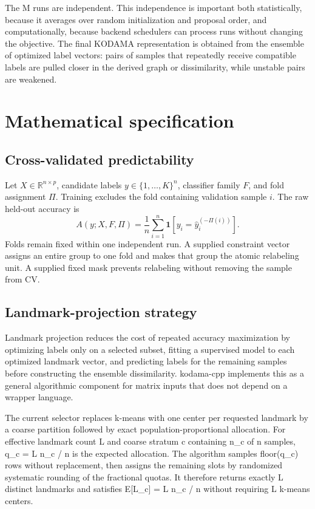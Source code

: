 \documentclass[twoside,11pt]{article}
\begin{document}
The M runs are independent. This independence is important both statistically, because it averages over random initialization and proposal order, and computationally, because backend schedulers can process runs without changing the objective. The final KODAMA representation is obtained from the ensemble of optimized label vectors: pairs of samples that repeatedly receive compatible labels are pulled closer in the derived graph or dissimilarity, while unstable pairs are weakened.

\section{Mathematical specification}
\subsection{Cross-validated predictability}
Let $X\in\mathbb{R}^{n\times p}$, candidate labels $y\in\{1,\ldots,K\}^{n}$, classifier family $F$, and fold assignment $\Pi$. Training excludes the fold containing validation sample $i$. The raw held-out accuracy is
\begin{equation}
A(y;X,F,\Pi)=\frac{1}{n}\sum_{i=1}^{n}
\mathbf{1}\!\left[y_i=\widehat y_i^{(-\Pi(i))}\right].
\end{equation}
Folds remain fixed within one independent run. A supplied constraint vector assigns an entire group to one fold and makes that group the atomic relabeling unit. A supplied fixed mask prevents relabeling without removing the sample from CV.

\subsection{Landmark-projection strategy}
Landmark projection reduces the cost of repeated accuracy maximization by optimizing labels only on a selected subset, fitting a supervised model to each optimized landmark vector, and predicting labels for the remaining samples before constructing the ensemble dissimilarity. kodama-cpp implements this as a general algorithmic component for matrix inputs that does not depend on a wrapper language.

The current selector replaces k-means with one center per requested landmark by a coarse partition followed by exact population-proportional allocation. For effective landmark count L and coarse stratum c containing n\_c of n samples, q\_c = L n\_c / n is the expected allocation. The algorithm samples floor(q\_c) rows without replacement, then assigns the remaining slots by randomized systematic rounding of the fractional quotas. It therefore returns exactly L distinct landmarks and satisfies E[L\_c] = L n\_c / n without requiring L k-means centers.
\end{document}
